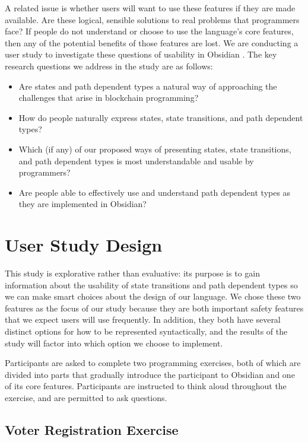 \documentclass[sigplan,10pt,review]{acmart}\settopmatter{printfolios=true}
\begin{document}
	A related issue is whether users will want to use these features if they are made available. Are 
these logical, sensible solutions to real problems that programmers face? If people do not 
understand or choose to use the language's core features, then any of the potential benefits 
of those features are lost. 
	We are conducting a user study to investigate these questions of usability in Obsidian \cite{Myers}. The 
key research questions we address in the study are as follows:
\begin{itemize}
\item Are states and path dependent types a natural way of 
	approaching the challenges that arise in blockchain programming?
\item How do people naturally express states, state transitions, and path dependent types?
\item Which (if any) of our proposed ways of presenting states, state transitions, and path dependent types
	is most understandable and usable by programmers?
\item Are people able to effectively use and understand path dependent types as they
are implemented in Obsidian?
\end{itemize}

\section{User Study Design}
	
This study is explorative rather than evaluative: its purpose is to gain information about the usability of state transitions 
and path dependent types so we can make smart choices about the design of our language. 
We chose these two features as the focus of our study because they are both important safety features 
that we expect users will use frequently. In addition, they both have several distinct options for how to be 
represented syntactically, and the results of the study will factor into which option we choose to implement.  

Participants are asked to complete two programming exercises, both of which are divided into parts that 
gradually introduce the participant to Obsidian and one of its core features. 
Participants are instructed to think aloud throughout the exercise, and are permitted to ask questions.

\subsection{Voter Registration Exercise}
\end{document}
